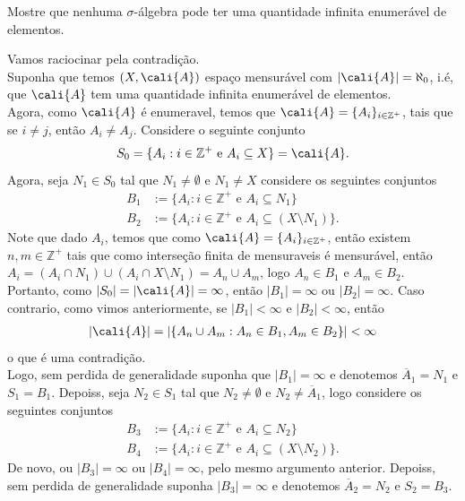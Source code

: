 \begin{homeworkProblem}[1]
  Mostre que nenhuma $\sigma$-álgebra pode ter uma quantidade infinita enumerável de elementos.
  \begin{solution}
    Vamos raciocinar pela contradição.\\
    Suponha que temos $(X,\cali{A})$ espaço mensurável com $|\cali{A}|=\aleph_{0}$, i.é, que $\cali{A}$ tem uma quantidade infinita enumerável de elementos.\\
    
    Agora, como $\cali{A}$ é enumeravel, temos que $\cali{A}=\{A_i\}_{i\in\mathbb{Z}^{+}}$, tais que se $i\neq j$, então $A_i\neq A_j$. Considere o seguinte conjunto
    \begin{align*}
      S_0=\{A_i: i\in\mathbb{Z}^{+}\text{ e }A_i\subseteq X\}=\cali{A}.
    \end{align*}
    Agora, seja $N_1\in S_0$ tal que $N_1\neq\emptyset$ e $N_1\neq X$ considere os seguintes conjuntos
    \begin{align*}
      B_1&:=\{A_i:i\in\mathbb{Z}^{+}\text{ e }A_i\subseteq N_1\}\\
      B_2&:=\{A_i:i\in\mathbb{Z}^{+}\text{ e }A_i\subseteq (X\setminus N_1)\}.
    \end{align*}
    Note que dado $A_i$, temos que como $\cali{A}=\{A_i\}_{i\in\mathbb{Z}^{+}}$, então existem $n,m\in \mathbb{Z}^{+}$ tais que como interseção finita de mensuraveis é mensurável, então $A_i=(A_i\cap N_1)\cup(A_i\cap X\setminus N_1)=A_n\cup A_m$, logo $A_n\in B_1$ e $A_m\in B_2$. Portanto, como $|S_0|=|\cali{A}|=\infty$, então $|B_1|=\infty$ ou $|B_2|=\infty$. Caso contrario, como vimos anteriormente, se $|B_1|<\infty$ e $|B_2|<\infty$, então
    \begin{align*}
      |\cali{A}|=|\{A_n\cup A_m: A_n\in B_1,A_m\in B_2\}|<\infty  
    \end{align*}
    o que é uma contradição.\\
    Logo, sem perdida de generalidade suponha que $|B_1|=\infty$ e denotemos $\overline{A}_1=N_1$ e $S_1=B_1$. Depoiss, seja $N_2\in S_1$ tal que $N_2\neq \emptyset$ e $N_2\neq \overline{A}_1$, logo considere os seguintes conjuntos
    \begin{align*}
      B_3&:=\{A_i:i\in\mathbb{Z}^{+}\text{ e }A_i\subseteq N_2\}\\
      B_4&:=\{A_i:i\in\mathbb{Z}^{+}\text{ e }A_i\subseteq (X\setminus N_2)\}.
    \end{align*}
    De novo, ou $|B_3|=\infty$ ou $|B_4|=\infty$, pelo mesmo argumento anterior. Depoiss, sem perdida de generalidade suponha $|B_3|=\infty$ e denotemos $\overline{A}_2=N_2$ e $S_2=B_3$.\\

\end{solution}
\end{homeworkProblem}
